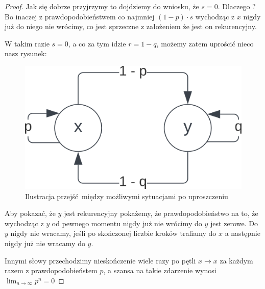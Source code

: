 \begin{proof}
    Jak się dobrze przyjrzymy to dojdziemy do wniosku, że \( s = 0 \). Dlaczego ?
    Bo inaczej z prawdopodobieństwem co najmniej \( (1-p) \cdot s \) wychodząc z \( x \)
    nigdy już do niego nie wrócimy, co jest sprzeczne z założeniem że jest on rekurencyjny.
    
    W takim razie \(s = 0\), a co za tym idzie \(r = 1 - q\), możemy zatem uprościć nieco nasz rysunek:
    
    \begin{figure}[H]
        \centering
        \includegraphics{img/markov-chains/recurrent-communicated-a-posteriori.png}
        \caption{Ilustracja przejść między możliwymi sytuacjami po uproszczeniu}
    \end{figure}
    
    Aby pokazać, że \( y \) jest rekurencyjny pokażemy, że prawdopodobieństwo na to, że wychodząc z \(y \) od pewnego momentu nigdy już nie wrócimy do \( y \) jest zerowe.
    Do \( y \) nigdy nie wracamy, jeśli po skończonej liczbie kroków trafiamy do \( x \) a następnie
    nigdy już nie wracamy do \( y \).
    
    Innymi słowy przechodzimy nieskończenie wiele razy po pętli \( x \rightarrow x \) za każdym razem z prawdopodobieństem \( p \), a szansa na takie zdarzenie wynosi \( \lim_{n \rightarrow \infty} p^n = 0 \)
    
    
    
    

\end{proof}

